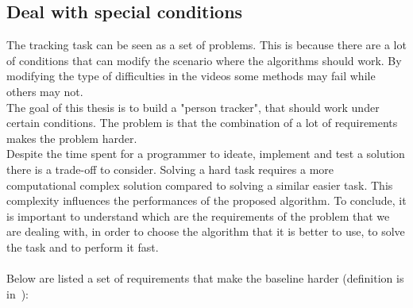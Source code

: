 \subsection{Deal with special conditions}\label{sec:tracking-conditions}
The tracking task can be seen as a set of problems. This is because there are a lot of conditions that can modify the scenario where the algorithms should work. By modifying the type of difficulties in the videos some methods may fail while others may not.\\
The goal of this thesis is to build a "person tracker", that should work under certain conditions. The problem is that the combination of a lot of requirements makes the problem harder.\\
Despite the time spent for a programmer to ideate, implement and test a solution there is a trade-off to consider. Solving a hard task requires a more computational complex solution compared to solving a similar easier task. This complexity influences the performances of the proposed algorithm. To conclude, it is important to understand which are the requirements of the problem that we are dealing with, in order to choose the algorithm that it is better to use, to solve the task and to perform it fast.\\
\\
Below are listed a set of requirements that make the baseline harder (definition is in~):
